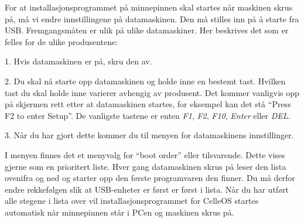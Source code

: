 For at installasjonsprogrammet p\aa{} minnepinnen skal startes n\aa r maskinen skrus p\aa , m\aa{} vi endre innstillingene p\aa{} datamaskinen. Den m\aa{} stilles inn p\aa{} \aa{} starte fra USB. Fremgangsm\aa ten er ulik p\aa{} ulike datamaskiner. Her beskrives det som er felles for de ulike produsentene: 
\item{1.} Hvis datamaskinen er p\aa, skru den av.
\item{2.} Du skal n\aa{} starte opp datamaskinen og holde inne en bestemt tast. Hvilken tast du skal holde inne varierer avhengig av produsent. Det kommer vanligvis opp p\aa{} skjermen rett etter at datamaskinen startes, for eksempel kan det st\aa{} ``Press F2 to enter Setup''. De vanligste tastene er enten {\it F1}, {\it F2}, {\it F10}, {\it Enter} eller {\it DEL}.
\item{3.} N\aa r du har gjort dette kommer du til menyen for datamaskinens innstillinger. 
\medskip
{}
\item{} I menyen finnes det et menyvalg for ``boot order'' eller tilsvarende. Dette vises gjerne som en prioritert liste. Hver gang datamaskinen skrus p\aa{} leser den lista ovenifra og ned og starter opp den f\o rste programvaren den finner. Du m\aa{} derfor endre rekkef\o lgen slik at USB-enheter er f\o rst er f\o rst i lista.
\smallskip
\noindent N\aa r du har utf\o rt alle stegene i lista over vil installasjonsprogrammet for CelleOS startes automatisk n\aa r minnepinnen st\aa r i PCen og maskinen skrus p\aa.



